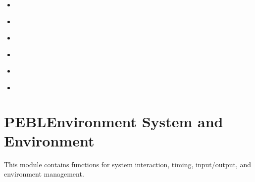 \documentclass[letterpaper,10pt,english]{sphinxmanual}
\begin{document}
\sphinxAtStartPar
{}
\begin{itemize}
\item {} 
\sphinxAtStartPar
{\hyperref[\detokenize{reference/design::doc}]{}}

\item {} 
\sphinxAtStartPar
{\hyperref[\detokenize{reference/graphics::doc}]{}}

\item {} 
\sphinxAtStartPar
{\hyperref[\detokenize{reference/html::doc}]{}}

\item {} 
\sphinxAtStartPar
{\hyperref[\detokenize{reference/math::doc}]{}}

\item {} 
\sphinxAtStartPar
{\hyperref[\detokenize{reference/ui::doc}]{}}

\item {} 
\sphinxAtStartPar
{\hyperref[\detokenize{reference/utility::doc}]{}}

\end{itemize}

\sphinxstepscope


\section{PEBLEnvironment \sphinxhyphen{} System and Environment}
\label{\detokenize{reference/peblenvironment:peblenvironment-system-and-environment}}\label{\detokenize{reference/peblenvironment::doc}}
\sphinxAtStartPar
This module contains functions for system interaction, timing, input/output, and environment management.
\end{document}
